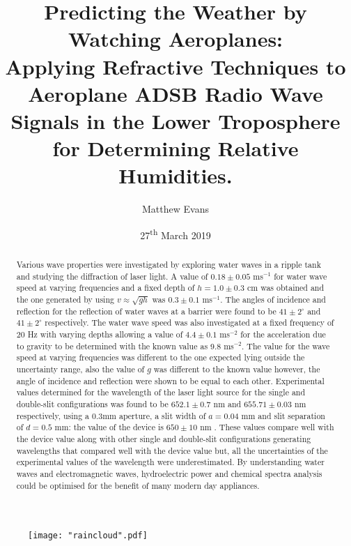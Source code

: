 \documentclass{article}
\title{\textbf{\huge Predicting the Weather by Watching Aeroplanes: 
\\ 
\Large
Applying Refractive Techniques to Aeroplane ADSB Radio Wave Signals in the Lower Troposphere for Determining Relative Humidities.}}
\author{Matthew Evans}%
\date{27\textsuperscript{th} March 2019} %
\begin{document}
\maketitle %

\begin{figure}[h]
\centering
\texttt{[image: "raincloud".pdf]}
\label{fig:raincloud}
\end{figure}

\thispagestyle{empty}
\newpage



\vspace*{\fill}
\begin{abstract}

\noindent
Various wave properties were investigated by exploring water waves in a ripple tank and studying the diffraction of laser light. A value of $ 0.18 \pm 0.05$ ms$^{-1}$ for water wave speed at varying frequencies and a fixed depth of $h = 1.0 \pm 0.3$ cm was obtained and the one generated by using $v \approx \sqrt{gh}$ \cite{Book02} was $ 0.3 \pm 0.1$ ms$^{-1}$. The angles of incidence and reflection for the reflection of water waves at a barrier were found to be $41 \pm 2^{\circ}$ and $41 \pm 2^{\circ}$ respectively. The water wave speed was also investigated at a fixed frequency of $20$ Hz with varying depths allowing a value of $4.4 \pm 0.1$ ms$^{-2}$ for the acceleration due to gravity to be determined with the known value as 9.8 ms$^{-2}$. The value for the wave speed at varying frequencies was different to the one expected lying outside the uncertainty range, also the value of $g$ was different to the known value however, the angle of incidence and reflection were shown to be equal to each other. Experimental values determined for the wavelength of the laser light source for the single and double-slit configurations was found to be $652.1 \pm 0.7$ nm and $655.71 \pm 0.03$ nm respectively, using a 0.3mm aperture, a slit width of $a = 0.04$ mm and slit separation of $d = 0.5$ mm: the value of the device is $650 \pm 10$ nm \cite{Web02}. These values compare well with the device value along with other single and double-slit configurations generating wavelengths that compared well with the device value but, all the uncertainties of the experimental values of the wavelength were underestimated. By understanding water waves and electromagnetic waves, hydroelectric power and chemical spectra analysis could be optimised for the benefit of many modern day appliances.
\thispagestyle{empty}
\end{abstract}
\vspace*{\fill}
\end{document}
